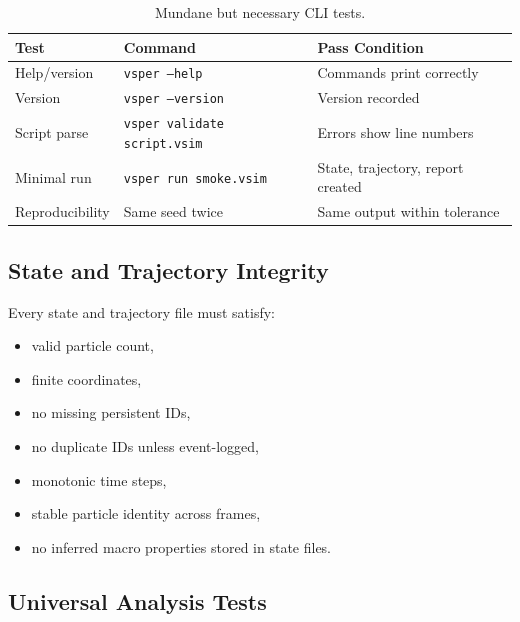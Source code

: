 \documentclass[12pt]{article}
\begin{document}
\begin{table}[H]
\centering
\caption{Mundane but necessary CLI tests.}
\label{tab:cli_tests}
\begin{tabular}{lll}
\toprule
\textbf{Test} & \textbf{Command} & \textbf{Pass Condition} \\
\midrule
Help/version   & \texttt{vsper --help}             & Commands print correctly \\
Version        & \texttt{vsper --version}           & Version recorded \\
Script parse   & \texttt{vsper validate script.vsim}& Errors show line numbers \\
Minimal run    & \texttt{vsper run smoke.vsim}      & State, trajectory, report created \\
Reproducibility & Same seed twice                   & Same output within tolerance \\
\bottomrule
\end{tabular}
\end{table}

\subsection{State and Trajectory Integrity}

Every state and trajectory file must satisfy:

\begin{itemize}[noitemsep]
	\item valid particle count,
	\item finite coordinates,
	\item no missing persistent IDs,
	\item no duplicate IDs unless event-logged,
	\item monotonic time steps,
	\item stable particle identity across frames,
	\item no inferred macro properties stored in state files.
\end{itemize}

\subsection{Universal Analysis Tests}
\end{document}
